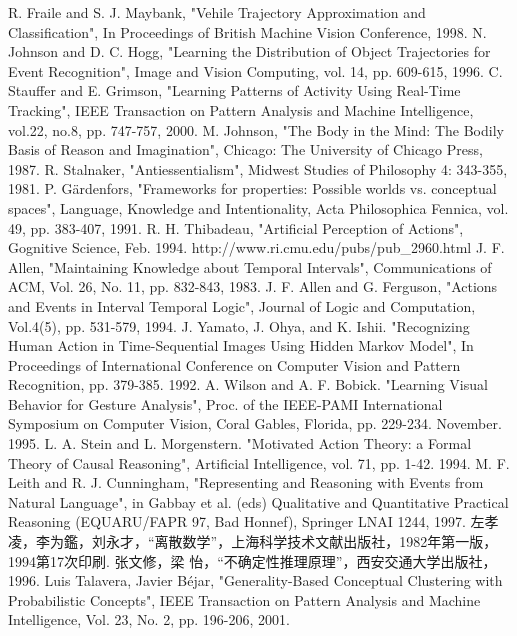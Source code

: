\begin{thebibliography}{200}
 R. Fraile and S. J. Maybank, "Vehile Trajectory Approximation and Classification", In Proceedings of British Machine Vision Conference, 1998.
 N. Johnson and D. C. Hogg, "Learning the Distribution of Object Trajectories for Event Recognition", Image and Vision Computing, vol. 14, pp. 609-615, 1996.
 C. Stauffer and E. Grimson, "Learning Patterns of Activity Using Real-Time Tracking", IEEE Transaction on Pattern Analysis and Machine Intelligence, vol.22, no.8, pp. 747-757, 2000.
 M. Johnson, "The Body in the Mind: The Bodily Basis of Reason and Imagination", Chicago: The University of Chicago Press, 1987.
 R. Stalnaker, "Antiessentialism", Midwest Studies of Philosophy 4: 343-355, 1981.
 P. G\"{a}rdenfors, "Frameworks for properties: Possible worlds vs. conceptual spaces", Language, Knowledge and Intentionality, Acta Philosophica Fennica, vol. 49, pp. 383-407, 1991.
 R. H. Thibadeau, "Artificial Perception of Actions", Gognitive Science, Feb. 1994. http://www.ri.cmu.edu/pubs/pub\_2960.html
 J. F. Allen, "Maintaining Knowledge about Temporal Intervals", Communications of ACM, Vol. 26, No. 11, pp. 832-843, 1983.
 J. F. Allen and G. Ferguson, "Actions and Events in Interval Temporal Logic", Journal of Logic and Computation, Vol.4(5), pp. 531-579, 1994.
 J. Yamato, J. Ohya, and K. Ishii. "Recognizing Human Action in Time-Sequential Images Using Hidden Markov Model", In Proceedings of International Conference on Computer Vision and Pattern Recognition, pp. 379-385. 1992.
 A. Wilson and A. F. Bobick. "Learning Visual Behavior for Gesture Analysis", Proc. of the IEEE-PAMI International Symposium on Computer Vision, Coral Gables, Florida, pp. 229-234. November. 1995.
 L. A. Stein and L. Morgenstern. "Motivated Action Theory: a Formal Theory of Causal Reasoning", Artificial Intelligence, vol. 71, pp. 1-42. 1994.
  M. F. Leith and R. J. Cunningham, "Representing and Reasoning with Events from Natural Language", in Gabbay et al. (eds) Qualitative and Quantitative Practical Reasoning (EQUARU/FAPR 97, Bad Honnef), Springer LNAI 1244, 1997.
 左孝凌，李为鑑，刘永才，“离散数学”，上海科学技术文献出版社，1982年第一版，1994第17次印刷.
 张文修，梁  怡，“不确定性推理原理”，西安交通大学出版社，1996.
 Luis  Talavera, Javier  Béjar, "Generality-Based Conceptual Clustering with Probabilistic Concepts", IEEE Transaction on Pattern Analysis and Machine Intelligence, Vol. 23, No. 2, pp. 196-206, 2001.

\end{thebibliography}

